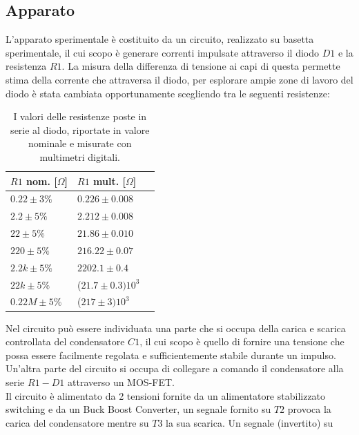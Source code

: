 \documentclass{article}[a4paper, oneside, 11pt]
\begin{document}
\subsection{Apparato}
L'apparato sperimentale è costituito da un circuito, realizzato su basetta 
sperimentale, il cui scopo è generare correnti impulsate attraverso il diodo 
$D1$ e la resistenza $R1$. La misura della differenza di tensione ai capi di questa 
permette stima della corrente che attraversa il diodo, per esplorare ampie zone 
di lavoro del diodo è stata cambiata opportunamente scegliendo tra le seguenti 
resistenze:\\
\begin{table}[H]
    \begin{center}
	\begin{tabular}{lll}
	    \toprule
	    $R1$ nom. [$\Omega$] & $R1$ mult. [$\Omega$] \\ 
	    \midrule
	    \midrule
	    $0.22 \pm 3 \% $         & $0.226 \pm 0.008$ \\
	    $2.2 \pm 5 \% $          & $2.212 \pm 0.008$ \\
	    $22 \pm 5 \% $           & $21.86 \pm 0.010$ \\ 
	    $220 \pm 5 \% $          & $216.22 \pm 0.07$ \\
	    $2.2 k \pm 5 \% $        & $2202.1 \pm 0.4$ \\
	    $22 k \pm 5 \% $         & ($21.7 \pm 0.3)10^3$ \\
	    $0.22 M \pm 5 \% $        & ($217 \pm 3)10^3$ \\
	    \bottomrule
	\end{tabular}
	\caption{I valori delle resistenze poste in serie al diodo, riportate in
		valore nominale e misurate con multimetri digitali. \label{tab: res}}
    \end{center}
\end{table}
Nel circuito può essere individuata una parte che si occupa della carica e 
scarica controllata del condensatore $C1$, il cui scopo è quello di fornire una 
tensione che possa essere facilmente regolata e sufficientemente stabile 
durante un impulso. Un'altra parte del circuito si occupa di collegare a 
comando il condensatore alla serie $R1-D1$ attraverso un MOS-FET.\\
Il circuito è alimentato da 2 tensioni fornite da un alimentatore stabilizzato 
switching e da un Buck Boost Converter, un segnale fornito su $T2$ provoca la 
carica del condensatore mentre su $T3$ la sua scarica. Un segnale (invertito) su 
\end{document}
